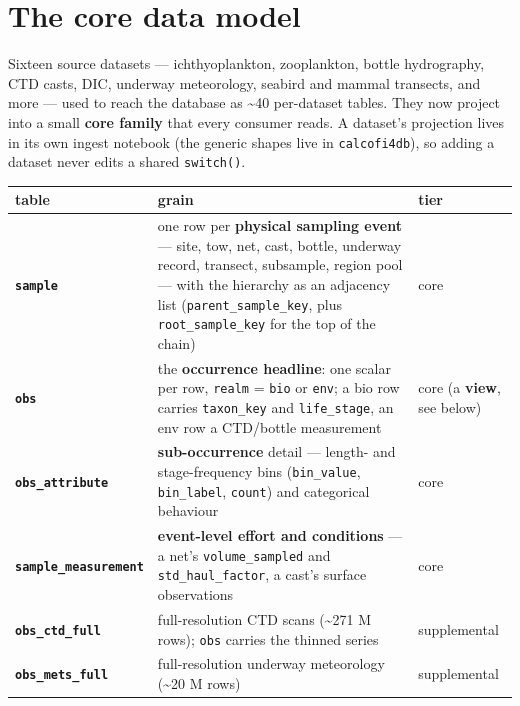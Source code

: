 \documentclass[
  letterpaper,
  DIV=11,
  numbers=noendperiod]{scrreprt}
\begin{document}
\section{The core data model}\label{the-core-data-model}

Sixteen source datasets --- ichthyoplankton, zooplankton, bottle
hydrography, CTD casts, DIC, underway meteorology, seabird and mammal
transects, and more --- used to reach the database as \textasciitilde40
per-dataset tables. They now project into a small \textbf{core family}
that every consumer reads. A dataset's projection lives in its own
ingest notebook (the generic shapes live in \texttt{calcofi4db}), so
adding a dataset never edits a shared \texttt{switch()}.

\begin{longtable}[]{@{}
  >{\raggedright\arraybackslash}p{}
  >{\raggedright\arraybackslash}p{}
  >{\raggedright\arraybackslash}p{}@{}}
\toprule\noalign{}
\begin{minipage}[b]{\linewidth}\raggedright
table
\end{minipage} & \begin{minipage}[b]{\linewidth}\raggedright
grain
\end{minipage} & \begin{minipage}[b]{\linewidth}\raggedright
tier
\end{minipage} \\
\midrule\noalign{}
\endhead
\bottomrule\noalign{}
\endlastfoot
\textbf{\texttt{sample}} & one row per \textbf{physical sampling event}
--- site, tow, net, cast, bottle, underway record, transect, subsample,
region pool --- with the hierarchy as an adjacency list
(\texttt{parent\_sample\_key}, plus \texttt{root\_sample\_key} for the
top of the chain) & core \\
\textbf{\texttt{obs}} & the \textbf{occurrence headline}: one scalar per
row, \texttt{realm} = \texttt{bio} or \texttt{env}; a bio row carries
\texttt{taxon\_key} and \texttt{life\_stage}, an env row a CTD/bottle
measurement & core (a \textbf{view}, see below) \\
\textbf{\texttt{obs\_attribute}} & \textbf{sub-occurrence} detail ---
length- and stage-frequency bins (\texttt{bin\_value},
\texttt{bin\_label}, \texttt{count}) and categorical behaviour & core \\
\textbf{\texttt{sample\_measurement}} & \textbf{event-level effort and
conditions} --- a net's \texttt{volume\_sampled} and
\texttt{std\_haul\_factor}, a cast's surface observations & core \\
\textbf{\texttt{obs\_ctd\_full}} & full-resolution CTD scans
(\textasciitilde271 M rows); \texttt{obs} carries the thinned series &
supplemental \\
\textbf{\texttt{obs\_mets\_full}} & full-resolution underway meteorology
(\textasciitilde20 M rows) & supplemental \\
\end{longtable}
\end{document}
